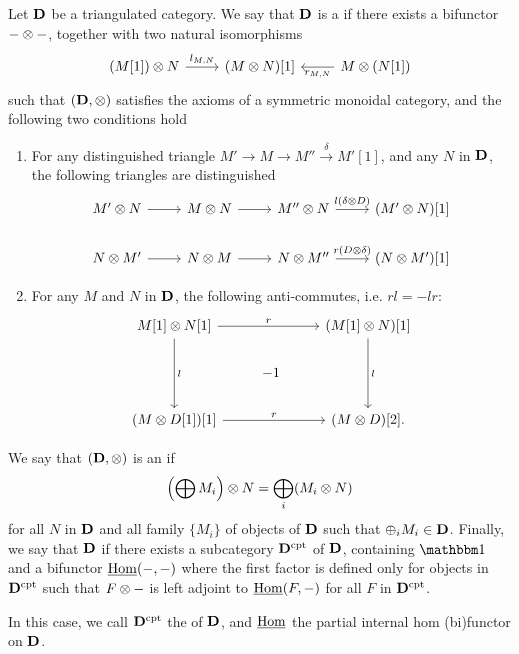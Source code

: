 \begin{defn}\label{def_tensor_triang_cat}
Let $\DCat[D]$ be a triangulated category. We say that $\DCat[D]$ 
is a  if there exists a bifunctor
$- \tensor -$, together with two natural isomorphisms 
\[
\begin{tikzcd}
(M[1]) \tensor N \arrow{r}{l_{M, N}}&
(M \tensor N)[1] &
M \tensor (N[1]) \arrow{l}{r_{M, N}}
\end{tikzcd}
\]
such that $(\DCat[D], \tensor)$ satisfies the axioms of a 
symmetric monoidal category, and the following two conditions
hold
\begin{enumerate}
\item For any distinguished triangle $M' \to M \to M'' 
\stackrel{\delta}{\to} M'[1]$, and any $N$ in $\DCat[D]$,
the following triangles are distinguished
\[
\begin{tikzcd}
M' \tensor N \arrow{r} &
M \tensor N \arrow{r} &
M'' \tensor N \arrow{r}{l(\delta \tensor D)}&
(M' \tensor N)[1] \\
N \tensor M' \arrow{r} &
N \tensor M \arrow{r} &
N \tensor M'' \arrow{r}{r(D \tensor \delta)}&
(N \tensor M')[1]
\end{tikzcd}
\]

\item For any $M$ and $N$ in $\DCat[D]$, the following 
anti-commutes, i.e. $rl = -lr$:
\[
\begin{tikzcd}
M[1] \tensor N[1] \arrow{rr}{r}\arrow{dd}{l} && 
(M[1] \tensor N)[1] \arrow{dd}{l} \\
& -1 \\
(M \tensor D[1])[1] \arrow{rr}{r} &&
(M \tensor D)[2].
\end{tikzcd}
\]
\end{enumerate}

We say that $(\DCat, \tensor)$ is an  if 
\[
\left(\bigoplus M_i\right) \tensor N = \bigoplus_i (M_i \tensor N)
\]
for all $N$ in $\DCat$ and all family $\{M_i\}$ of objects of 
$\DCat$ such that $\oplus_i M_i \in \DCat$. Finally, we say that
$\DCat$  if there exists a 
subcategory $\DCat^{\compact}$ of $\DCat$, containing $\Unit$ and 
a bifunctor $\ihom(-,-)$ where the first factor is defined only 
for objects in $\DCat^{\compact}$ such that $F \tensor -$ is left 
adjoint to $\ihom(F, -)$ for all $F$ in $\DCat^{\compact}$.

In this case, we call $\DCat^{\compact}$ the  
of $\DCat$, and $\ihom$ the partial internal hom (bi)functor on
$\DCat$.
\end{defn}

